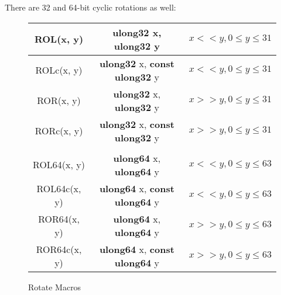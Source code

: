 \documentclass[synpaper]{book}
\begin{document}
There are 32 and 64-bit cyclic rotations as well:
       
\begin{figure}[hpbt]
\begin{small}
\begin{center}
\begin{tabular}{|c|c|c|}
     \hline ROL(x, y) & {\bf ulong32} x, {\bf ulong32} y & $x << y, 0 \le y \le 31$ \\
     \hline ROLc(x, y) & {\bf ulong32} x, {\bf const ulong32} y & $x << y, 0 \le y \le 31$ \\
     \hline ROR(x, y) & {\bf ulong32} x, {\bf ulong32} y & $x >> y, 0 \le y \le 31$ \\
     \hline RORc(x, y) & {\bf ulong32} x, {\bf const ulong32} y & $x >> y, 0 \le y \le 31$ \\
     \hline && \\
     \hline ROL64(x, y) & {\bf ulong64} x, {\bf ulong64} y & $x << y, 0 \le y \le 63$ \\
     \hline ROL64c(x, y) & {\bf ulong64} x, {\bf const ulong64} y & $x << y, 0 \le y \le 63$ \\
     \hline ROR64(x, y) & {\bf ulong64} x, {\bf ulong64} y & $x >> y, 0 \le y \le 63$ \\
     \hline ROR64c(x, y) & {\bf ulong64} x, {\bf const ulong64} y & $x >> y, 0 \le y \le 63$ \\
     \hline
\end{tabular}
\caption{Rotate Macros}
\end{center}
\end{small}
\end{figure}
\end{document}
